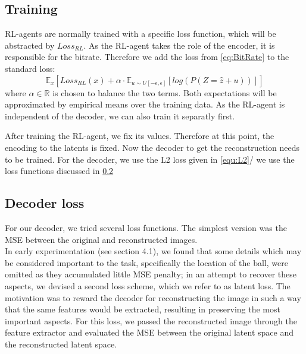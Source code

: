 



\subsection{Training}
    RL-agents are normally trained with a specific loss function, which will be
    abstracted by $Loss_{RL}$. As the RL-agent takes the role of the encoder, it
    is responsible for the bitrate. Therefore we add the loss from
    \ref{eq:BitRate} to the standard loss:
    \begin{equation}\label{eq:RL_Training_Loss}
        \mathbb{E}_{x}[Loss_{RL}(x) + \alpha\cdot \mathbb{E}_{u \sim U[-\epsilon, \epsilon]}[log(P(Z=\hat{z} + u))]]
    \end{equation} where $\alpha \in \mathbb{R}$ is chosen to balance the two terms.
    Both expectations will be approximated by empirical means over the training
    data. As the RL-agent is independent of the decoder, we can also train it
    separatly first.

    After training the RL-agent, we fix its values. Therefore at this point, the
    encoding to the latents is fixed. Now the decoder to get the reconstruction
    needs to be trained. For the decoder, we use the L2 loss given in \ref{equ:L2}/ we use the loss functions discussed in \ref{sub:Decoder_Loss}

\subsection{Decoder loss}\label{sub:Decoder_Loss}
    For our decoder, we tried several loss functions. The simplest version was
    the MSE between the original and reconstructed images. \\
    In early experimentation (see section 4.1), we found that some details which
    may be considered important to the task, specifically the location of the
    ball, were omitted as they accumulated little MSE penalty; in an attempt to
    recover these aspects, we devised a second loss scheme, which we refer to as
    latent loss. The motivation was to reward the decoder for reconstructing the
    image in such a way that the same features would be extracted, resulting in
    preserving the most important aspects. For this loss, we passed the
    reconstructed image through the feature extractor and evaluated the MSE
    between the original latent space and the reconstructed latent space.

